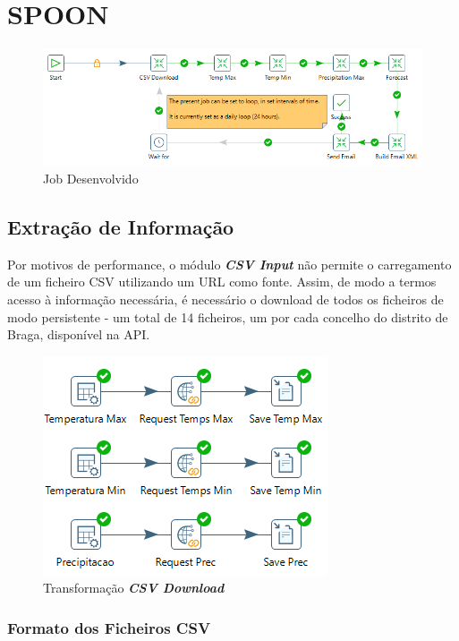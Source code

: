 \newpage

\section*{SPOON}

\begin{figure}[H]
    \centering
    \includegraphics[scale=0.66]{imagens-spoon/job.png}
    \caption{Job Desenvolvido}
\end{figure}

\subsection*{Extração de Informação}

Por motivos de performance, o módulo \textbf{\textit{CSV Input}} não permite o carregamento de um ficheiro CSV utilizando um URL como fonte. 
Assim, de modo a termos acesso à informação necessária, é necessário o download de todos os ficheiros de modo persistente - um total de 14 ficheiros, um por cada concelho do distrito de Braga, disponível na API.

\begin{figure}[H]
    \centering
    \includegraphics{imagens-spoon/csv_download.png}
    \caption{Transformação \textbf{\textit{CSV Download}}}
\end{figure}

\subsubsection*{Formato dos Ficheiros CSV}

